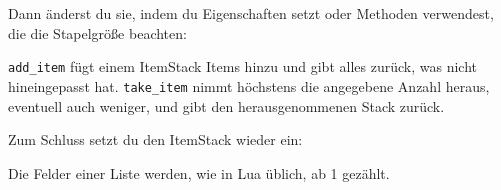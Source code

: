 Dann änderst du sie, indem du Eigenschaften setzt oder Methoden
verwendest, die die Stapelgröße beachten:

\begin{Shaded}
\begin{Highlighting}[]
  \OperatorTok{=}\OperatorTok{(}\OperatorTok{)}
  \OperatorTok{=}\OperatorTok{(}\OperatorTok{)}
  \OperatorTok{=} \OperatorTok{:}\OperatorTok{(}\OperatorTok{)}
  \OperatorTok{=} \OperatorTok{:}\OperatorTok{(}\OperatorTok{)}

\OperatorTok{(}
         \OperatorTok{:}\OperatorTok{()}
         
\OperatorTok{)}

\OperatorTok{(}  \OperatorTok{:}\OperatorTok{()}  \OperatorTok{)}
\end{Highlighting}
\end{Shaded}

\texttt{add\_\allowbreak{}item} fügt einem ItemStack Items hinzu und
gibt alles zurück, was nicht hineingepasst hat.
\texttt{take\_\allowbreak{}item} nimmt höchstens die angegebene Anzahl
heraus, eventuell auch weniger, und gibt den herausgenommenen Stack
zurück.

Zum Schluss setzt du den ItemStack wieder ein:

\begin{Shaded}
\begin{Highlighting}[]
\OperatorTok{:}\OperatorTok{(}\OperatorTok{,} \OperatorTok{,} \OperatorTok{)}
\end{Highlighting}
\end{Shaded}

Die Felder einer Liste werden, wie in Lua üblich, ab 1 gezählt.

